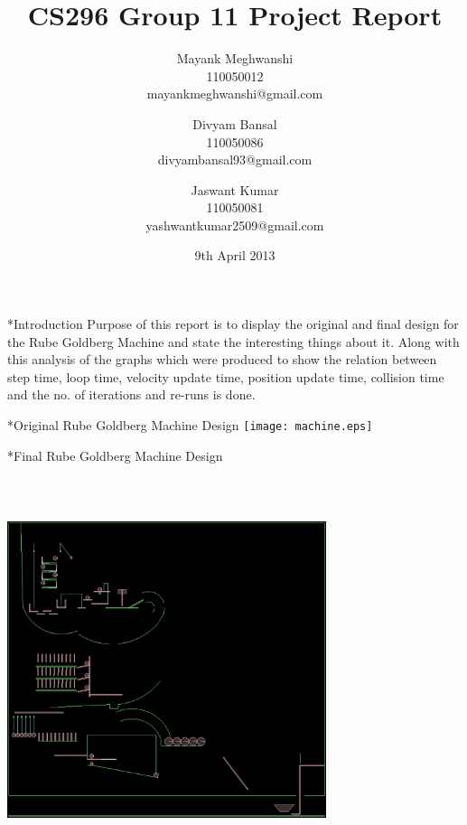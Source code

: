 \documentclass[11pt]{article}
\begin{document}
\title{CS296 Group 11 Project Report}
\author{Mayank Meghwanshi\\110050012 \\mayankmeghwanshi@gmail.com 
	\and Divyam Bansal \\ 110050086\\divyambansal93@gmail.com
	\and Jaswant Kumar \\ 110050081 \\yashwantkumar2509@gmail.com
}
\date{9th April 2013}
\maketitle

\begin{section}*{Introduction}
Purpose of this report is to display the original and final design for the Rube Goldberg Machine and state the interesting things about it. Along with this analysis of the graphs which were produced to show the relation between step time, loop time, velocity update time, position update time, collision time and the no. of iterations and re-runs is done.

\end{section}

\begin{subsection}*{Original Rube Goldberg Machine Design}
\texttt{[image: machine.eps]} 
\end{subsection}
\begin{subsection}*{Final Rube Goldberg Machine Design}
\includegraphics[width=0.7\textwidth,height=12cm,keepaspectratio]{final.eps}
\end{subsection}
\end{document}
